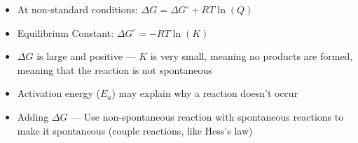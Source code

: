 \documentclass[12pt]{article}
\begin{document}
\begin{itemize}
  \item At non-standard conditions: $\Delta G=\Delta G^{\circ} + RT\ln(Q)$

  \item Equilibrium Constant: $\Delta G^{\circ}=-RT\ln(K)$

  \item $\Delta G$ is large and positive — $K$ is very small, meaning no products are formed, meaning that the reaction is not spontaneous

  \item Activation energy ($E_a$) may explain why a reaction doesn't occur

  \item Adding $\Delta G$ — Use non-spontaneous reaction with spontaneous reactions to make it spontaneous (couple reactions, like Hess's law)

\end{itemize}
\end{document}
